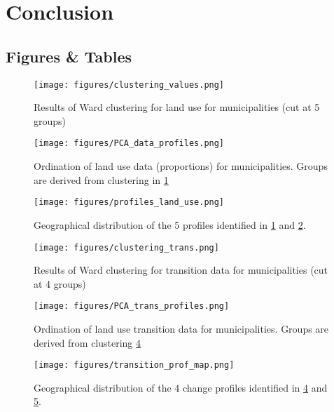 \section{Conclusion}

\newpage
\begin{center}
\section*{Figures \& Tables}
\end{center}

\begin{figure}[h!]
  \centering
    \texttt{[image: figures/clustering\_values.png]}
  \caption{Results of Ward clustering for land use for municipalities (cut at 5 groups)}
  \label{fig:clustervals}
\end{figure}

\begin{figure}[h!]
  \centering
    \texttt{[image: figures/PCA\_data\_profiles.png]}
  \caption{Ordination of land use data (proportions) for municipalities. Groups are derived from clustering in \ref{fig:clustervals}}
  \label{fig:PCAvals}
\end{figure}

\begin{figure}[h!]
  \centering
    \texttt{[image: figures/profiles\_land\_use.png]}
  \caption{Geographical distribution of the 5 profiles identified in \ref{fig:clustervals} and \ref{fig:PCAvals}.}
  \label{fig:mapvals}
\end{figure}

\begin{figure}[h!]
  \centering
    \texttt{[image: figures/clustering\_trans.png]}
  \caption{Results of Ward clustering for transition data for municipalities (cut at 4 groups)}
  \label{fig:clustertrans}
\end{figure}

\begin{figure}[h!]
  \centering
    \texttt{[image: figures/PCA\_trans\_profiles.png]}
  \caption{Ordination of land use transition data for municipalities. Groups are derived from clustering \ref{fig:clustertrans}}
  \label{fig:PCAtrans}
\end{figure}

\begin{figure}[h!]
  \centering
    \texttt{[image: figures/transition\_prof\_map.png]}
  \caption{Geographical distribution of the 4 change profiles identified in \ref{fig:clustertrans} and \ref{fig:PCAtrans}.}
  \label{fig:maptrans}
\end{figure}

